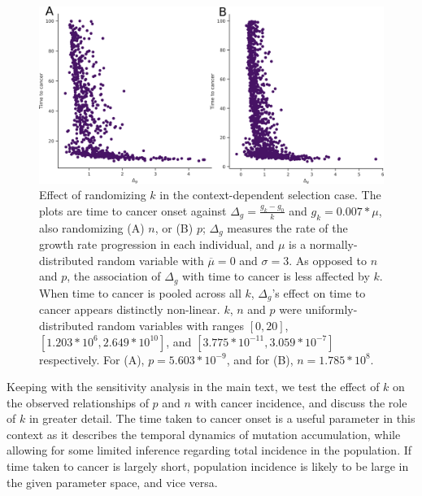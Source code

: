 \documentclass[9pt,twocolumn,twoside]{pnas-new}
\begin{document}
		\begin{figure}[tbhp]
			\centering
			\includegraphics[width=\linewidth, keepaspectratio=true]{figS2-2.png}
			\caption{Effect of randomizing $k$ in the context-dependent selection case. The plots are time to cancer onset against $\Delta_{g} = \frac{g_{k}-g_{0}}{k}$ and $g_{k} = 0.007*\mu$, also randomizing (A) $n$, or (B) $p$; $\Delta_{g}$ measures the rate of the growth rate progression in each individual, and $\mu$ is a normally-distributed random variable with $\overline{\mu}=0$ and $\sigma=3$. As opposed to $n$ and $p$, the association of $\Delta_{g}$ with time to cancer is less affected by $k$. When time to cancer is pooled across all $k$, $\Delta_{g}$'s effect on time to cancer appears distinctly non-linear. $k$, $n$ and $p$ were uniformly-distributed random variables with ranges $[0, 20]$, $[1.203*10^{6}, 2.649*10^{10}]$, and $[3.775*10^{-11}, 3.059*10^{-7}]$ respectively. For (A), $p=5.603*10^{-9}$, and for (B), $n=1.785*10^{8}$.}
			\label{figS2.2}
		\end{figure}

		Keeping with the sensitivity analysis in the main text, we test the effect of $k$ on the observed relationships of $p$ and $n$ with cancer incidence, and discuss the role of $k$ in greater detail. The time taken to cancer onset is a useful parameter in this context as it describes the temporal dynamics of mutation accumulation, while allowing for some limited inference regarding total incidence in the population. If time taken to cancer is largely short, population incidence is likely to be large in the given parameter space, and vice versa.
\end{document}
